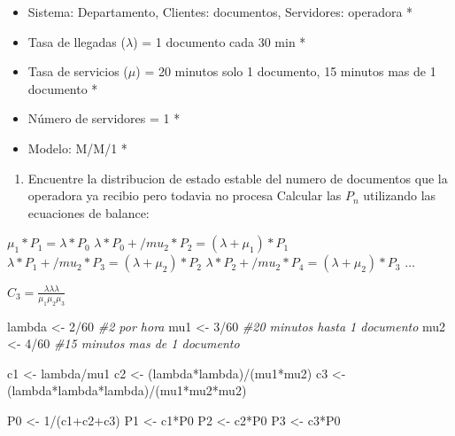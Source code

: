 \documentclass[
]{article}
\newenvironment{Shaded}{\begin{snugshade}}{\end{snugshade}}
\newcommand{\CommentTok}[1]{\textcolor[rgb]{0.56,0.35,0.01}{\textit{#1}}}
\newcommand{\DecValTok}[1]{\textcolor[rgb]{0.00,0.00,0.81}{#1}}
\newcommand{\NormalTok}[1]{#1}
\newcommand{\OtherTok}[1]{\textcolor[rgb]{0.56,0.35,0.01}{#1}}
\newcommand{\SpecialCharTok}[1]{\textcolor[rgb]{0.00,0.00,0.00}{#1}}
\providecommand{\tightlist}{%
  \setlength{\itemsep}{0pt}\setlength{\parskip}{0pt}}
\begin{document}
\begin{itemize}
\item
  Sistema: Departamento, Clientes: documentos, Servidores: operadora *
\item
  Tasa de llegadas (\(\lambda\)) = 1 documento cada 30 min *
\item
  Tasa de servicios (\(\mu\)) = 20 minutos solo 1 documento, 15 minutos
  mas de 1 documento *
\item
  Número de servidores = 1 *
\item
  Modelo: M/M/1 *
\end{itemize}

\begin{enumerate}
\def\labelenumi{\alph{enumi})}
\tightlist
\item
  Encuentre la distribucion de estado estable del numero de documentos
  que la operadora ya recibio pero todavia no procesa Calcular las
  \(P_n\) utilizando las ecuaciones de balance:
\end{enumerate}

\(\mu_1*P_1 = \lambda*P_0\)
\(\lambda*P_0 + /mu_2*P_2 = (\lambda+\mu_1)*P_1\)
\(\lambda*P_1 + /mu_2*P_3 = (\lambda+\mu_2)*P_2\)
\(\lambda*P_2 + /mu_2*P_4 = (\lambda+\mu_2)*P_3\) \(\dots\)

\(C_3 = \frac{\lambda\lambda\lambda}{\mu_1\mu_2\mu_3}\)

\begin{Shaded}
\begin{Highlighting}[]
\NormalTok{lambda }\OtherTok{\textless{}{-}} \DecValTok{2}\SpecialCharTok{/}\DecValTok{60} \CommentTok{\#2 por hora}
\NormalTok{mu1 }\OtherTok{\textless{}{-}} \DecValTok{3}\SpecialCharTok{/}\DecValTok{60} \CommentTok{\#20 minutos hasta 1 documento}
\NormalTok{mu2 }\OtherTok{\textless{}{-}} \DecValTok{4}\SpecialCharTok{/}\DecValTok{60} \CommentTok{\#15 minutos mas de 1 documento}

\NormalTok{c1 }\OtherTok{\textless{}{-}}\NormalTok{ lambda}\SpecialCharTok{/}\NormalTok{mu1}
\NormalTok{c2 }\OtherTok{\textless{}{-}}\NormalTok{ (lambda}\SpecialCharTok{*}\NormalTok{lambda)}\SpecialCharTok{/}\NormalTok{(mu1}\SpecialCharTok{*}\NormalTok{mu2)}
\NormalTok{c3 }\OtherTok{\textless{}{-}}\NormalTok{ (lambda}\SpecialCharTok{*}\NormalTok{lambda}\SpecialCharTok{*}\NormalTok{lambda)}\SpecialCharTok{/}\NormalTok{(mu1}\SpecialCharTok{*}\NormalTok{mu2}\SpecialCharTok{*}\NormalTok{mu2)}

\NormalTok{P0 }\OtherTok{\textless{}{-}} \DecValTok{1}\SpecialCharTok{/}\NormalTok{(c1}\SpecialCharTok{+}\NormalTok{c2}\SpecialCharTok{+}\NormalTok{c3)}
\NormalTok{P1 }\OtherTok{\textless{}{-}}\NormalTok{ c1}\SpecialCharTok{*}\NormalTok{P0}
\NormalTok{P2 }\OtherTok{\textless{}{-}}\NormalTok{ c2}\SpecialCharTok{*}\NormalTok{P0}
\NormalTok{P3 }\OtherTok{\textless{}{-}}\NormalTok{ c3}\SpecialCharTok{*}\NormalTok{P0}
\end{Highlighting}
\end{Shaded}
\end{document}
